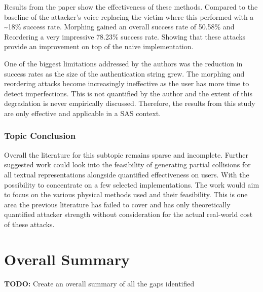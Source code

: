 Results from the paper show the effectiveness of these 
methods. Compared to the baseline of the attacker's voice 
replacing the victim where this performed with a 
\textasciitilde18\% success rate. Morphing gained an 
overall success rate of 50.58\% and Reordering a very 
impressive 78.23\% success rate. Showing that these 
attacks provide an improvement on top of the naive implementation.

One of the biggest limitations addressed by the authors 
was the reduction in success rates as the size of the 
authentication string grew. The morphing and reordering 
attacks become increasingly ineffective as the user has 
more time to detect imperfections. This is not quantified by 
the author and the extent of this degradation is never 
empirically discussed. Therefore, the results from this 
study are only effective and applicable in a SAS context.



\subsubsection{Topic Conclusion}
Overall the literature for this subtopic remains sparse and incomplete. Further suggested work could look into the feasibility of generating partial collisions for all textual representations alongside quantified effectiveness on users. With the possibility to concentrate on a few selected implementations. The work would aim to focus on the various physical methods used and their feasibility. This is one area the previous literature has failed to cover and has only theoretically quantified attacker strength without consideration for the actual real-world cost of these attacks.

\section{Overall Summary}
\textbf{TODO: } Create an overall summary of all the gaps identified